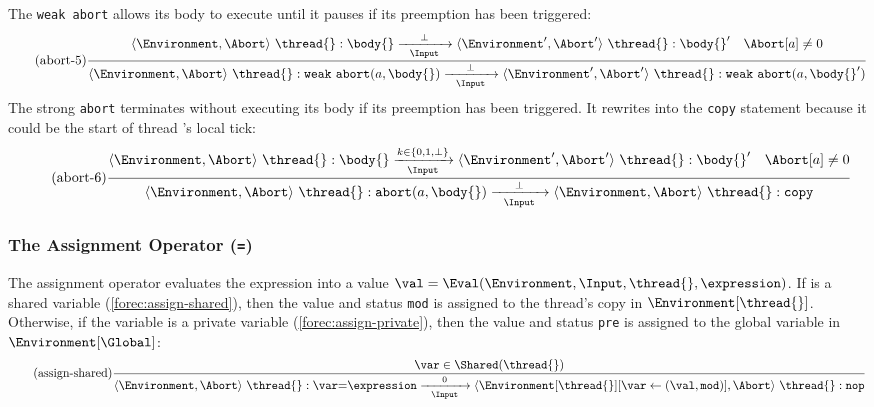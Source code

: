 The \verb$weak abort$ allows its body to execute until it pauses if its 
preemption has been triggered:
\begin{equation*}
	\tag{abort-5}
	\label{forec:abort-5}
	\frac{
			\langle \Environment, \Abort \rangle ~ \thread{}:\body{}
				\xrightarrow[~~\Input~~]{\bot} 
			\langle \Environment', \Abort' \rangle ~ \thread{}:\body{}'
			\quad
			\Abort[a] \neq 0
		}{
			\langle \Environment, \Abort \rangle ~ \thread{}:\mathtt{weak}~\mathtt{abort}(a, \body{})
				\xrightarrow[~~\Input~~]{\bot} 
			\langle \Environment', \Abort' \rangle ~ \thread{}:\mathtt{weak}~\mathtt{abort}(a, \body{}')
		}
\end{equation*}
The strong \verb$abort$ terminates without executing its body if its preemption has been triggered. 
It rewrites into the \verb$copy$ statement because it could be the start of thread \thread{}'s 
local tick:
\begin{equation*}
	\tag{abort-6}
	\label{forec:abort-6}
	\frac{
			\langle \Environment, \Abort \rangle ~ \thread{}:\body{}
				\xrightarrow[~~\Input~~]{k \in \lbrace 0, 1, \bot \rbrace} 
			\langle \Environment', \Abort' \rangle ~ \thread{}:\body{}'
			\quad
			\Abort[a] \neq 0
		}{
			\langle \Environment, \Abort \rangle ~ \thread{}:\mathtt{abort}(a, \body{})
				\xrightarrow[~~\Input~~]{\bot} 
			\langle \Environment, \Abort \rangle ~ \thread{}:\mathtt{copy}
		}
\end{equation*}

\subsubsection{The Assignment Operator (\texttt{=})}
The assignment operator evaluates the expression
\expression{} into a value $\val = \Eval(\Environment, \Input, \thread{}, \expression)$.
If \var{} is a shared variable (\ref{forec:assign-shared}), then the value and status \verb$mod$ 
is assigned to the thread's copy in $\Environment[\thread{}]$. 
Otherwise, if the variable \var{} is a private variable (\ref{forec:assign-private}), then the value 
and status \verb$pre$ is assigned to the global variable in $\Environment[\Global]$:
\begin{equation*}
	\tag{assign-shared}
	\label{forec:assign-shared}
	\frac{
			\var \in \Shared(\thread{})
		}{
			\langle \Environment, \Abort \rangle ~ \thread{}:\var \mathtt{=} \expression
				\xrightarrow[~~\Input~~]{0} 
			\langle \Environment[\thread{}][\var \gets (\val, \texttt{mod})], \Abort \rangle ~ \thread{}:\mathtt{nop}
		}
\end{equation*}

